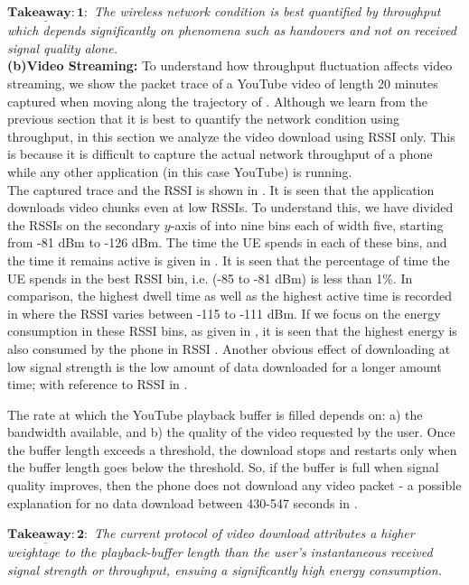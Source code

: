 $\mathrm{\mathbf{\underline{Takeaway:1}}}:$ \textit{The wireless network condition is best quantified by throughput which depends  significantly on phenomena such as handovers and not  on received signal quality alone.}\\
{\textbf{(b)Video Streaming:}}\label{sec:chap03s3:vstreaming}
To understand how throughput fluctuation affects video streaming, 
we show the packet trace of a YouTube video of length 20 minutes captured when moving along the trajectory of \fig{\ref{fig:chap03s3:technology_with_traj}}.  Although we learn from the previous section that it is best to quantify the network condition using throughput, in this section we analyze the video download using \ac{RSSI} only. This is because it is difficult to capture the actual network throughput of a phone while any other application (in this case YouTube) is running.\\
\indent The  captured trace and the \ac{RSSI}  is shown in \fig{\ref{fig:chap03s3:pcap_RSSI}}. It is seen that the application downloads video chunks even at low \acp{RSSI}. To understand this, we have divided the \acp{RSSI} on the secondary $y$-axis of \fig{\ref{fig:chap03s3:pcap_RSSI}} into nine bins each of width five, starting from -81 dBm to -126 dBm. The time the \ac{UE} spends in each of these bins, and the time it remains active is given in \fig{\ref{fig:chap03s3:vid_time}}. It is seen that the percentage of time the \ac{UE} spends in the best \ac{RSSI} bin, i.e.  (-85 to -81 dBm) is less than 1\%. In comparison, the highest dwell time   as well as the highest active time is recorded in  where the \ac{RSSI} varies between -115 to -111 dBm. If we focus on the energy consumption in these \ac{RSSI} bins, as given in \fig{\ref{fig:chap03s3:vid_thpt}}, it is seen that the highest energy is also consumed by the phone in \ac{RSSI} . Another obvious effect of downloading at low signal strength is the low amount of data downloaded for a longer amount time; with reference to \ac{RSSI}  in \fig{\ref{fig:chap03s3:vid_thpt}}.


\indent The rate at which the YouTube playback buffer is filled depends on: a) the bandwidth available, and b) the quality of the video requested by the user. Once the buffer length exceeds a threshold, the download stops and restarts only when the buffer length goes below the threshold. So, if the buffer is full when signal quality improves, then the phone does not download any video packet - a possible explanation for no data download between  430-547 seconds in \fig{ \ref{fig:chap03s3:pcap_RSSI}}.


$\mathrm{\mathbf{\underline{Takeaway:2}}}:$ \textit{The current protocol of  video download attributes a higher weightage to the playback-buffer length than the user's instantaneous received signal strength or throughput, ensuing a significantly high energy consumption.}\\
